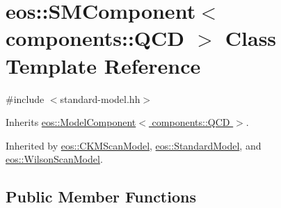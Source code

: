 \hypertarget{classeos_1_1SMComponent_3_01components_1_1QCD_01_4}{
\section{eos::SMComponent$<$ components::QCD $>$ Class Template Reference}
\label{classeos_1_1SMComponent_3_01components_1_1QCD_01_4}
}


{\ttfamily \#include $<$standard-\/model.hh$>$}

Inherits \hyperlink{classeos_1_1ModelComponent_3_01components_1_1QCD_01_4}{eos::ModelComponent$<$ components::QCD $>$}.

Inherited by \hyperlink{classeos_1_1CKMScanModel}{eos::CKMScanModel}, \hyperlink{classeos_1_1StandardModel}{eos::StandardModel}, and \hyperlink{classeos_1_1WilsonScanModel}{eos::WilsonScanModel}.\subsection*{Public Member Functions}
